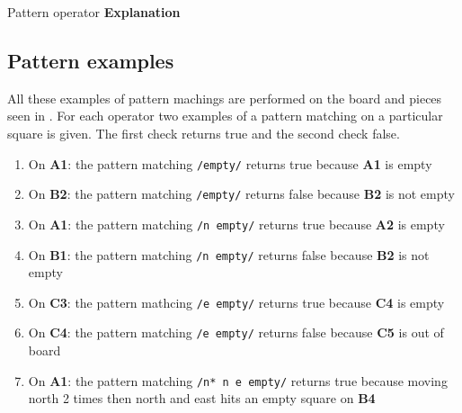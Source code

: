          {Pattern operator                       }{\textbf{Explanation}}{
}

\subsection{Pattern examples}
\label{sec:patternexamples}
All these examples of pattern machings are performed on the board and pieces
seen in . For each operator two examples of a pattern
matching on a particular square is given. The first check returns true and the
second check false.

\begin{enumerate}[noitemsep]
  \item On \textbf{A1}: the pattern matching \texttt{/empty/} returns true because
    \textbf{A1} is empty
  \item On \textbf{B2}: the pattern matching \texttt{/empty/} returns false because
    \textbf{B2} is not empty
  \item On \textbf{A1}: the pattern matching \texttt{/n empty/} returns true
    because \textbf{A2} is empty
  \item On \textbf{B1}: the pattern matching \texttt{/n empty/} returns false
    because \textbf{B2} is not empty
  \item On \textbf{C3}: the pattern mathcing \texttt{/e empty/} returns true
    because \textbf{C4} is empty
  \item On \textbf{C4}: the pattern matching \texttt{/e empty/} returns false
    because \textbf{C5} is out of board
  \item On \textbf{A1}: the pattern matching \texttt{/n* n e empty/} returns true
    because moving north 2 times then north and east hits an empty square on
    \textbf{B4}
\end{enumerate}


